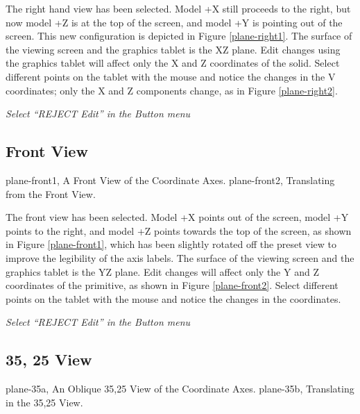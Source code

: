 
The right hand view has been selected. Model +X still proceeds to the right,
but now model +Z is at the top of the screen, and model +Y is
pointing out of the screen.
This new configuration is depicted in Figure \ref{plane-right1}.
The surface of the viewing screen and the graphics tablet is the XZ plane.
Edit changes using the graphics tablet will affect only the X and Z 
coordinates of the solid.
Select different points on the tablet with the mouse and notice the
changes in the V coordinates;  only the X and Z components change,
as in Figure \ref{plane-right2}.

{\em Select ``REJECT Edit'' in the Button menu}

\subsection{Front View}
\mfig plane-front1, A Front View of the Coordinate Axes.
\mfig plane-front2, Translating from the Front View.


The front view has been selected.  Model +X points out of the screen,
model +Y points to the right, and model +Z points towards the top
of the screen, as shown in Figure \ref{plane-front1},
which has been slightly rotated off the preset view to improve
the legibility of the axis labels.
The surface of the viewing screen and the graphics tablet is the YZ
plane.  Edit changes will affect only the Y and Z 
coordinates of the primitive, as shown in Figure \ref{plane-front2}.
Select different points on the tablet with the mouse and notice the 
changes in the coordinates.

{\em Select ``REJECT Edit'' in the Button menu}

\subsection{35, 25 View}
\mfig plane-35a, An Oblique 35,25 View of the Coordinate Axes.
\mfig plane-35b, Translating in the 35,25 View.

